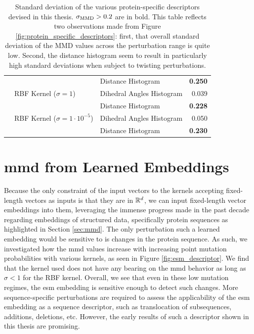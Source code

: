 \begin{table}
{\begin{tabular}{lllr}
                    &             & Distance Histogram &           \textbf{0.250} \\
                    & RBF Kernel ($\sigma=1$) & Dihedral Angles Histogram &           0.039 \\
                    &             & Distance Histogram &           \textbf{0.228} \\
                    & RBF Kernel ($\sigma=1\cdot 10^{-5}$) & Dihedral Angles Histogram &           0.050 \\
                    &             & Distance Histogram &           \textbf{0.230} \\
      \bottomrule
    \end{tabular}
  }
  \caption[Standard deviation of the various protein-specific descriptors
devised in this thesis.]{Standard deviation of the various protein-specific
descriptors devised in this thesis. $\sigma_{\text{MMD}}>0.2$ are in bold. This table
reflects two observations made from Figure
\ref{fig:protein_specific_descriptors}: first, that overall standard deviation
of the MMD values across the perturbation range is quite low. Second, the
distance histogram seem to result in particularly high standard deviations when
subject to twisting perturbations.
}
  \label{tab:protein_descriptors_std}
\end{table}

\section{\acrshort{mmd} from Learned Embeddings}

Because the only constraint of the input vectors to the kernels accepting
fixed-length vectors as inputs is that they are in $\mathbb{R}^d$, we can input
fixed-length vector embeddings into them, leveraging the immense progress made
in the past decade regarding embeddings of structured data, specifically protein
sequences as highlighted in Section \ref{sec:mmd}. The only perturbation such a
learned embedding would be sensitive to is changes in the protein sequence. As
such, we investigated how the \acrshort{mmd} values increase with increasing point mutation
probabilities with various kernels, as seen in Figure \ref{fig:esm_descriptor}.
We find that the kernel used does not have any bearing on the \acrshort{mmd} behavior as
long as $\sigma<1$ for the RBF kernel. Overall, we see that even in these low
mutation regimes, the \acrshort{esm} embedding is sensitive enough to detect such changes.
More sequence-specific perturbations are required to assess the
applicability of the \acrshort{esm} embedding as a sequence descriptor, such as
translocation of subsequences, additions, deletions, etc. However, the early
results of such a descriptor shown in this thesis are promising.

